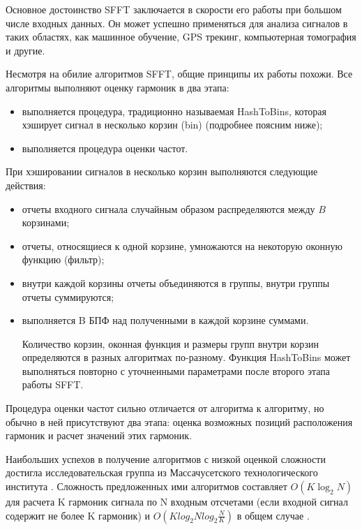 Основное достоинство SFFT заключается в скорости его работы при большом числе входных данных. Он может успешно применяться для анализа сигналов в таких областях, как машинное обучение, GPS трекинг, компьютерная томография и другие.


Несмотря на обилие алгоритмов SFFT, общие принципы их работы похожи. Все алгоритмы выполняют оценку гармоник в два этапа:

\begin{itemize}
	\item выполняется процедура, традиционно называемая HashToBins, которая хэширует сигнал в несколько корзин (bin) (подробнее поясним ниже);
	\item выполняется процедура оценки частот.
\end{itemize}

При хэшировании сигналов в несколько корзин выполняются следующие действия:
\begin{itemize}
	\item отчеты входного сигнала случайным образом распределяются между $B$ корзинами;
	\item отчеты, относящиеся к одной корзине, умножаются на некоторую
	оконную функцию (фильтр);
	\item внутри каждой корзины отчеты объединяются в группы, внутри группы отчеты суммируются;
	\item выполняется B БПФ над полученными в каждой корзине суммами.
	
	Количество корзин, оконная функция и размеры групп внутри корзин определяются в разных алгоритмах по-разному. Функция HashToBins может выполняться повторно с уточненными параметрами после второго этапа работы SFFT.
\end{itemize}

Процедура оценки частот сильно отличается от алгоритма к алгоритму, но обычно в ней присутствуют два этапа: оценка возможных позиций расположения гармоник и расчет значений этих гармоник.

Наибольших успехов в получение алгоритмов с низкой оценкой сложности достигла исследовательская группа из Массачусетского технологического института \cite{bottazzi2018new}. 
Сложность предложенных ими алгоритмов составляет $O(K \log_{2} N)$ для расчета K гармоник сигнала по N входным отсчетами (если входной сигнал содержит не более K гармоник) и $O(K log_{2} N log_{2} \frac{N}{K})$ в общем случае \cite{indyk2014sparse, indyk2014nearly}.


